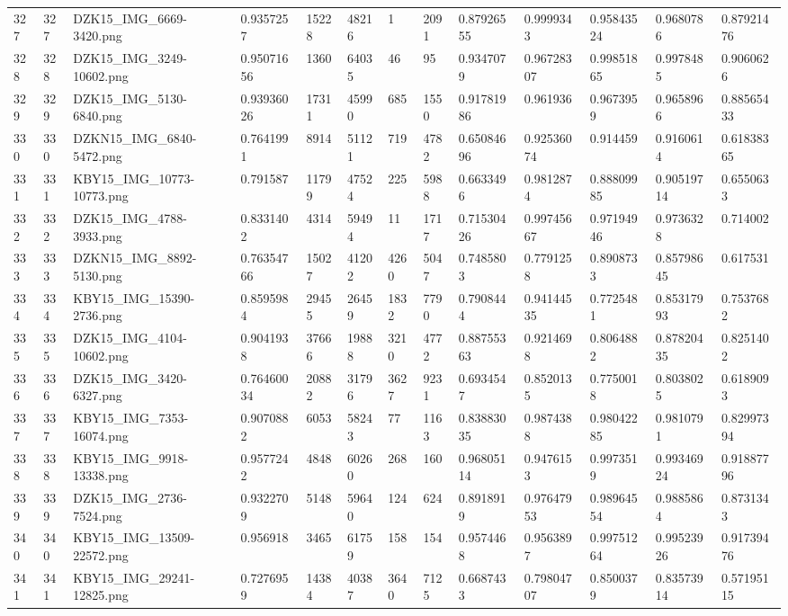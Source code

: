 \documentclass[11pt, a4paper, twoside]{report}
\begin{document}
\begin{longtable}[c]{@{}lllllllllllll@{}}
327 & 327 & DZK15\_IMG\_6669-3420.png & 0.9357257 & 15228 & 48216 & 1 & 2091 & 0.87926555 & 0.9999343 & 0.95843524 & 0.9680786 & 0.87921476 \\
328 & 328 & DZK15\_IMG\_3249-10602.png & 0.95071656 & 1360 & 64035 & 46 & 95 & 0.9347079 & 0.96728307 & 0.99851865 & 0.9978485 & 0.9060626 \\
329 & 329 & DZK15\_IMG\_5130-6840.png & 0.93936026 & 17311 & 45990 & 685 & 1550 & 0.91781986 & 0.961936 & 0.9673959 & 0.9658966 & 0.88565433 \\
330 & 330 & DZKN15\_IMG\_6840-5472.png & 0.7641991 & 8914 & 51121 & 719 & 4782 & 0.65084696 & 0.92536074 & 0.914459 & 0.9160614 & 0.61838365 \\
331 & 331 & KBY15\_IMG\_10773-10773.png & 0.791587 & 11799 & 47524 & 225 & 5988 & 0.6633496 & 0.9812874 & 0.88809985 & 0.90519714 & 0.6550633 \\
332 & 332 & DZK15\_IMG\_4788-3933.png & 0.8331402 & 4314 & 59494 & 11 & 1717 & 0.71530426 & 0.99745667 & 0.97194946 & 0.9736328 & 0.714002 \\
333 & 333 & DZKN15\_IMG\_8892-5130.png & 0.76354766 & 15027 & 41202 & 4260 & 5047 & 0.7485803 & 0.7791258 & 0.8908733 & 0.85798645 & 0.617531 \\
334 & 334 & KBY15\_IMG\_15390-2736.png & 0.8595984 & 29455 & 26459 & 1832 & 7790 & 0.7908444 & 0.94144535 & 0.7725481 & 0.85317993 & 0.7537682 \\
335 & 335 & DZK15\_IMG\_4104-10602.png & 0.9041938 & 37666 & 19888 & 3210 & 4772 & 0.88755363 & 0.9214698 & 0.8064882 & 0.87820435 & 0.8251402 \\
336 & 336 & DZK15\_IMG\_3420-6327.png & 0.76460034 & 20882 & 31796 & 3627 & 9231 & 0.6934547 & 0.8520135 & 0.7750018 & 0.8038025 & 0.6189093 \\
337 & 337 & KBY15\_IMG\_7353-16074.png & 0.9070882 & 6053 & 58243 & 77 & 1163 & 0.83883035 & 0.9874388 & 0.98042285 & 0.9810791 & 0.82997394 \\
338 & 338 & KBY15\_IMG\_9918-13338.png & 0.9577242 & 4848 & 60260 & 268 & 160 & 0.96805114 & 0.9476153 & 0.9973519 & 0.99346924 & 0.91887796 \\
339 & 339 & DZK15\_IMG\_2736-7524.png & 0.9322709 & 5148 & 59640 & 124 & 624 & 0.8918919 & 0.97647953 & 0.98964554 & 0.9885864 & 0.8731343 \\
340 & 340 & KBY15\_IMG\_13509-22572.png & 0.956918 & 3465 & 61759 & 158 & 154 & 0.9574468 & 0.9563897 & 0.99751264 & 0.99523926 & 0.91739476 \\
341 & 341 & KBY15\_IMG\_29241-12825.png & 0.7276959 & 14384 & 40387 & 3640 & 7125 & 0.6687433 & 0.79804707 & 0.8500379 & 0.83573914 & 0.57195115 \\

\end{longtable}
\end{document}
